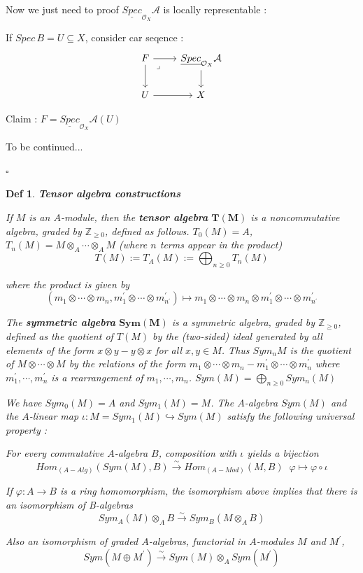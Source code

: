 \documentclass{article}
\newtheorem{definition}[theorem]{Def}
\newenvironment{Proof}{{\noindent \indent \it Proof:\quad}}{\hfill $\square$\par}
\begin{document}
\begin{Proof}
Now we just need to proof $\underline{Spec}_{\mathcal O_X}\mathcal A$ is locally representable :

If $Spec\, B=U\subseteq X$, consider car seqence :
\[\begin{tikzcd}
	F & {\underline{Spec}_{\mathcal O_X}\mathcal A} \\
	U & X
	\arrow[from=2-1, to=2-2]
	\arrow[from=1-1, to=2-1]
	\arrow[from=1-2, to=2-2]
	\arrow["\lrcorner"{anchor=center, pos=0.125}, draw=none, from=1-1, to=2-2]
	\arrow[from=1-1, to=1-2]
\end{tikzcd}\]

Claim : $F=\underline{Spec}_{\mathcal O_X}\mathcal A(U)$

To be continued...

\end{Proof}

\begin{definition}
    \textbf{Tensor algebra constructions}
    
If $M$ is an $A$-module, then the
\textbf{tensor algebra} $\bm{T(M)}$ is a noncommutative algebra, graded by $\mathbb Z_{\geq0}$, defined as
follows. $T_0(M) = A$, $T_n(M) = M \otimes_A \cdots \otimes_A M$ (where $n$ terms appear in the
product)
$$
T(M) := T_A(M) :=\bigoplus_{n\geq0}T_n(M)
$$

where the product is given by
$$(m_1 \otimes\cdots\otimes m_n, m_1^\prime \otimes\cdots\otimes m_{n^\prime}^\prime) \mapsto m_1 \otimes\cdots\otimes m_n \otimes m_1^\prime \otimes\cdots\otimes m_{n^\prime}^\prime$$

The \textbf{symmetric algebra} $\bm{Sym(M)}$ is a symmetric algebra, graded by $\mathbb Z_{\geq0}$, defined as the quotient of $T(M)$ by the (two-sided) ideal generated by all elements
of the form $x\otimes y-y\otimes x$ for all $x, y \in M$. Thus $Sym_n M$ is the quotient of $M\otimes\cdots\otimes M$
by the relations of the form $m_1 \otimes\cdots\otimes m_n - m_1^\prime \otimes\cdots\otimes m_n^\prime$ where $m_1^\prime, \cdots, m_n^\prime$
is a rearrangement of $m_1, \cdots, m_n$. 
$
Sym(M) =\bigoplus_{n\geq0}
Sym_n(M)
$

We have $Sym_0(M) = A$ and $Sym_1(M) = M$. The $A$-algebra $Sym(M)$ and the $A$-linear map $\iota: M = Sym_1(M) \hookrightarrow Sym(M)$ satisfy the following universal property :

For every
commutative $A$-algebra $B$, composition with $\iota$ yields a bijection
$$
Hom_{(A-Alg)}(Sym(M), B) \xrightarrow{\sim} Hom_{(A-Mod)}(M,B)\;\; \varphi \mapsto \varphi \circ \iota
$$

If $\varphi: A \to B$ is a ring homomorphism, the isomorphism above implies that there is an isomorphism
of B-algebras
$$
Sym_A(M) \otimes_A B \xrightarrow{\sim} Sym_B(M \otimes_A B)
$$

Also an isomorphism of graded $A$-algebras, functorial in $A$-modules $M$ and $M^\prime$,
$$Sym(M \oplus M^\prime) \xrightarrow{\sim} Sym(M) \otimes_A Sym(M^\prime)$$
\end{definition}
\end{document}

